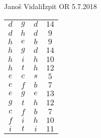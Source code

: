 \begin{naloga}{Janoš Vidali}{Izpit OR 5.7.2018}
\begin{odgovor}
\begin{tabela}[p]
\begin{tabular}{cc|cc}
$ d$ & $g$ & $d$ & $14$ \\
$ d$ & $h$ & $d$ & $9$ \\
$ h$ & $e$ & $b$ & $9$ \\
$ h$ & $g$ & $d$ & $14$ \\
$ h$ & $i$ & $h$ & $10$ \\
$ h$ & $t$ & $h$ & $12$ \\
$ e$ & $c$ & $s$ & $5$ \\
$ e$ & $f$ & $b$ & $7$ \\
$ e$ & $g$ & $e$ & $13$ \\
$ g$ & $t$ & $h$ & $12$ \\
$ c$ & $f$ & $b$ & $7$ \\
$ f$ & $i$ & $h$ & $10$ \\
$ i$ & $t$ & $i$ & $11$ \\
\end{tabular}
\end{tabela}
\end{odgovor}
\end{naloga}
